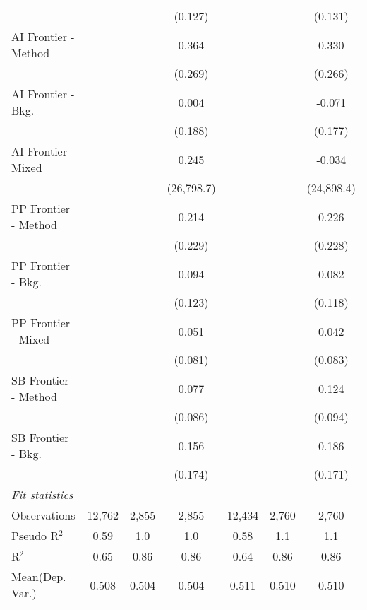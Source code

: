 \begin{tabular}{lcccccc}
                        &                &         & (0.127)    &                &         & (0.131)\\   
   AI Frontier - Method &                &         & 0.364      &                &         & 0.330\\   
                        &                &         & (0.269)    &                &         & (0.266)\\   
   AI Frontier - Bkg.   &                &         & 0.004      &                &         & -0.071\\   
                        &                &         & (0.188)    &                &         & (0.177)\\   
   AI Frontier - Mixed  &                &         & 0.245      &                &         & -0.034\\   
                        &                &         & (26,798.7) &                &         & (24,898.4)\\   
   PP Frontier - Method &                &         & 0.214      &                &         & 0.226\\   
                        &                &         & (0.229)    &                &         & (0.228)\\   
   PP Frontier - Bkg.   &                &         & 0.094      &                &         & 0.082\\   
                        &                &         & (0.123)    &                &         & (0.118)\\   
   PP Frontier - Mixed  &                &         & 0.051      &                &         & 0.042\\   
                        &                &         & (0.081)    &                &         & (0.083)\\   
   SB Frontier - Method &                &         & 0.077      &                &         & 0.124\\   
                        &                &         & (0.086)    &                &         & (0.094)\\   
   SB Frontier - Bkg.   &                &         & 0.156      &                &         & 0.186\\   
                        &                &         & (0.174)    &                &         & (0.171)\\   
   \midrule
   \emph{Fit statistics}\\
   Observations         & 12,762         & 2,855   & 2,855      & 12,434         & 2,760   & 2,760\\  
   Pseudo R$^2$         & 0.59           & 1.0     & 1.0        & 0.58           & 1.1     & 1.1\\  
   R$^2$                & 0.65           & 0.86    & 0.86       & 0.64           & 0.86    & 0.86\\  
Mean(Dep. Var.) & 0.508 & 0.504 & 0.504 & 0.511 & 0.510 & 0.510 \\
   

\end{tabular}

